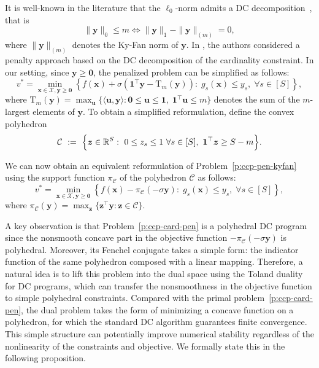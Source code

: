 \documentclass[11pt]{article}
\def\bs{\boldsymbol}
\def\Re{\mathbb{R}}
\def\C{\mathcal{C}}
\def\X{\mathcal{X}}
\def\kyfan{\mathrm{T}}
\begin{document}
It is well-known in the literature that the $\ell_0$-norm admits a DC decomposition~\cite{cui2021modern, gotoh2018dc}, that is 
\[
\|\bs{y}\|_0 \leq m \Longleftrightarrow \|\bs{y} \|_1 - \|\bs{y}\|_{(m)} = 0,
\]
where $\|\bs{y}\|_{(m)}$ denotes the Ky-Fan norm of $\bs{y}$. In \cite{gotoh2018dc}, the authors considered a penalty approach based on the DC decomposition of the cardinality constraint. In our setting, since $\bs{y} \geq \bs{0}$, the penalized problem can be simplified as follows:
\begin{equation} 
\label{p:ccp-pen-kyfan}
v^* = \min_{\bs{x}\in\X, \bs{y} \geq \bs{0}} \left \{ f(\bs{x}) + \sigma (\bs{1}^\top \bs{y} - \kyfan_m(\bs{y})):  \; g_s(\bs{x}) \leq y_s, \; \forall s\in [S]\right\},
\end{equation}
where $\kyfan_m(\bs{y})  = \max_{\bs{u}}\{\langle \bs{u}, \bs{y} \rangle : \bs{0} \leq \bs{u} \leq \bs{1},\; \bs{1} ^\top \bs{u} \leq m\}$ denotes the sum of the $m$-largest elements of $\bs{y}$. To obtain a simplified reformulation, define the convex polyhedron
\begin{equation*} 
\C\ :=\ \Bigl\{\bs{z}\in\Re^S:\ 0\le z_s\le 1\ \forall s\in[S],\ \bs{1}^\top \bs{z}\ge S-m\Bigr\}.
\end{equation*} 

We can now obtain an equivalent reformulation of Problem~\eqref{p:ccp-pen-kyfan} using the support function $\pi_{\C}$ of the polyhedron $\C$ as follows:
\begin{equation} 
\label{p:ccp-card-pen}
v^* = \min_{\bs{x}\in\X, \bs{y} \geq \bs{0}} \left \{ f(\bs{x}) - \pi_{\C}(-\sigma \bs{y}):  \; g_s(\bs{x}) \leq y_s, \; \forall s\in [S]\right\},
\end{equation}
where $\pi_{\C}(\bs{y}) = \max_{\bs{z}}\{\bs{z}^\top \bs{y} : \bs{z} \in \C\}$.

A key observation is that Problem~\eqref{p:ccp-card-pen} is a polyhedral DC program since the nonsmooth concave part in the objective function $- \pi_{\C}(-\sigma \bs{y})$ is polyhedral. Moreover, its Fenchel conjugate takes a simple form: the indicator function of the same polyhedron composed with a linear mapping. Therefore, a natural idea is to lift this problem into the dual space using the Toland duality~\cite{toland1978duality, horst1999dc, banert2019general} for DC programs, which can transfer the nonsmoothness in the objective function to simple polyhedral constraints. Compared with the primal problem~\eqref{p:ccp-card-pen}, the dual problem takes the form of minimizing a concave function on a polyhedron, for which the standard DC algorithm guarantees finite convergence. This simple structure can potentially improve numerical stability regardless of the nonlinearity of the constraints and objective. We formally state this in the following proposition.
\end{document}
